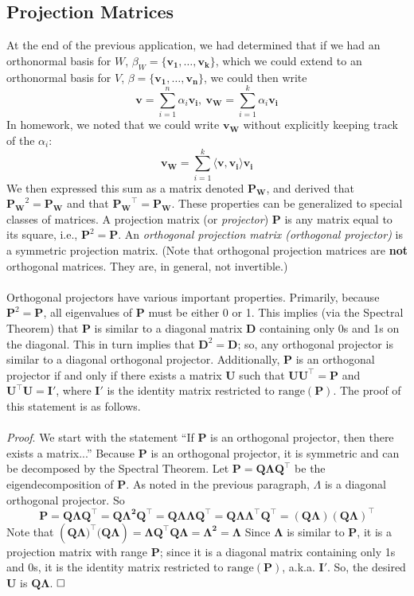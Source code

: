 \documentclass{article}
\begin{document}
\subsection{Projection Matrices}
At the end of the previous application, we had determined that if we had an orthonormal basis for $W$, $\beta_W = \{\mathbf{v_1}, \ldots, \mathbf{v_k}\}$, which we could extend to an orthonormal basis for $V$, $\beta = \{\mathbf{v_1}, \ldots, \mathbf{v_n}\}$, we could then write $$\mathbf{v} = \sum\limits_{i = 1}^n \alpha_i\mathbf{v_i},\ \mathbf{v_W} = \sum\limits_{i=1}^k \alpha_i\mathbf{v_i} $$ In homework, we noted that we could write $\mathbf{v_W}$ without explicitly keeping track of the $\alpha_i$: $$\mathbf{v_W} = \sum\limits_{i=1}^k \langle \mathbf{v}, \mathbf{v_i} \rangle \mathbf{v_i}$$ We then expressed this sum as a matrix denoted $\mathbf{P_W}$, and derived that $\mathbf{P_W}^2 = \mathbf{P_W}$ and that $\mathbf{P_W}^{\top} = \mathbf{P_W}$. These properties can be generalized to special classes of matrices. A projection matrix (or \textit{projector}) $\mathbf{P}$ is any matrix equal to its square, i.e., $\mathbf{P}^2 = \mathbf{P}$. An \textit{orthogonal projection matrix (orthogonal projector)} is a symmetric projection matrix. (Note that orthogonal projection matrices are \textbf{not} orthogonal matrices. They are, in general, not invertible.)\\\\
Orthogonal projectors have various important properties. Primarily, because $\mathbf{P}^2 = \mathbf{P}$, all eigenvalues of $\mathbf{P}$ must be either 0 or 1. This implies (via the Spectral Theorem) that $\mathbf{P}$ is similar to a diagonal matrix $\mathbf{D}$ containing only 0s and 1s on the diagonal. This in turn implies that $\mathbf{D}^2 = \mathbf{D}$; so, any orthogonal projector is similar to a diagonal orthogonal projector. Additionally, $\mathbf{P}$ is an orthogonal projector if and only if there exists a matrix $\mathbf{U}$ such that $\mathbf{UU^{\top}} = \mathbf{P}$ and $\mathbf{U^{\top}U} = \mathbf{I'}$, where $\mathbf{I'}$ is the identity matrix restricted to $\text{range}(\mathbf{P})$. The proof of this statement is as follows. \\\\
\textit{Proof}. We start with the statement ``If $\mathbf{P}$ is an orthogonal projector, then there exists a matrix...'' Because $\mathbf{P}$ is an orthogonal projector, it is symmetric and can be decomposed by the Spectral Theorem. Let $\mathbf{P} = \mathbf{Q\Lambda Q^{\top}}$ be the eigendecomposition of $\mathbf{P}$. As noted in the previous paragraph, $\Lambda$ is a diagonal orthogonal projector. So $$\mathbf{P} = \mathbf{Q\Lambda Q^{\top}} = \mathbf{Q\Lambda^2Q^{\top}} = \mathbf{Q\Lambda\Lambda Q^{\top}} = \mathbf{Q\Lambda\Lambda^{\top}Q^{\top}} = \mathbf{(Q\Lambda)(Q\Lambda)^{\top}}$$ Note that $(\mathbf{Q\Lambda)^{\top}(Q\Lambda}) = \mathbf{\Lambda Q^{\top}Q\Lambda} = \mathbf{\Lambda^2} = \mathbf{\Lambda}$ Since $\mathbf{\Lambda}$ is similar to $\mathbf{P}$, it is a projection matrix with range $\mathbf{P}$; since it is a diagonal matrix containing only 1s and 0s, it is the identity matrix restricted to $\text{range}(\mathbf{P})$, a.k.a. $\mathbf{I'}$. So, the desired $\mathbf{U}$ is $\mathbf{Q\Lambda}$. $\hfill\square$ \\
\end{document}
